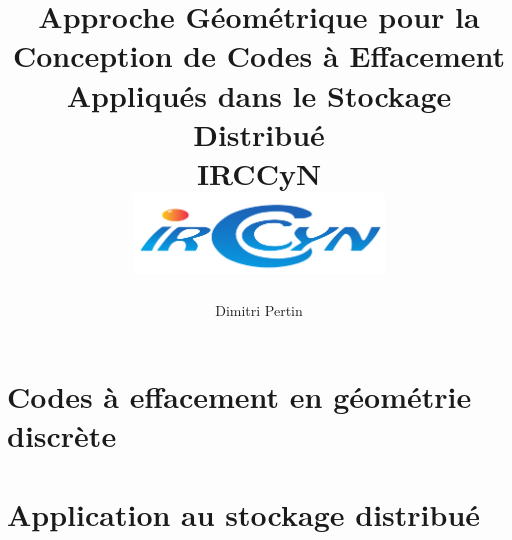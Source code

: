 
\makeindex



\title{
    {Approche Géométrique pour la Conception de Codes à Effacement Appliqués
    dans le Stockage Distribué}\\
    {\large IRCCyN}\\
    {\includegraphics[width=0.5\textwidth]{img/logo_irccyn.pdf}}
}
\author{Dimitri Pertin}
\date {}

\maketitle

\newpage

\dominitoc
\tableofcontents

\part{Codes à effacement en géométrie discrète}







\part{Application au stockage distribué}







\printbibliography[
]




